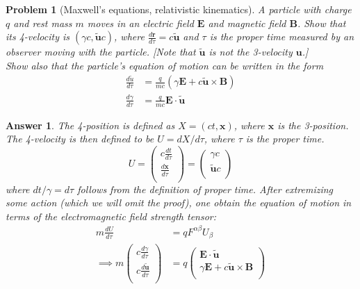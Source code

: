 \documentclass[a4paper]{article}
\newtheorem{ans}{Answer}
\theoremstyle{new}
\newtheorem{qns}{Problem}
\begin{document}
\begin{qns}[Maxwell's equations, relativistic kinematics]
A particle with charge $q$ and rest mass $m$ moves in an electric field $\mathbf{E}$ and magnetic field $\mathbf{B}$. Show that its 4-velocity is $(\gamma c,\mathbf{\tilde{u}}c)$, where $\frac{d\mathbf{r}}{d\tau}=c\tilde{\mathbf{u}}$ and $\tau$ is the proper time measured by an observer moving with the particle. [Note that $\tilde{\mathbf{u}}$ is not the 3-velocity $\mathbf{u}$.]\\[5pt]
Show also that the particle’s equation of motion can be written in the form
\begin{align}
    \frac{d\tilde{u}}{d\tau}&=\frac{q}{mc}(\gamma\mathbf{E}+c\tilde{\mathbf{u}}\times\mathbf{B})\nonumber\\
    \frac{d\gamma}{d\tau}&=\frac{q}{mc}\mathbf{E}\cdot\mathbf{\tilde{u}}\nonumber
\end{align}
\end{qns}
\begin{ans}
The 4-position is defined as $X=(ct,\mathbf{x})$, where $\mathbf{x}$ is the 3-position. The 4-velocity is then defined to be $U=dX/d\tau$, where $\tau$ is the proper time.
$$U=\begin{pmatrix}c\frac{dt}{d\tau}\\\frac{d\mathbf{x}}{d\tau}\\\end{pmatrix}=\begin{pmatrix}\gamma c\\\mathbf{\tilde{u}}c\\\end{pmatrix}$$
where $dt/\gamma=d\tau$ follows from the definition of proper time. After extremizing some action (which we will omit the proof), one obtain the equation of motion in terms of the electromagnetic field strength tensor:
\begin{align}
m\frac{dU}{d\tau}&=qF^{\alpha\beta}U_\beta\nonumber\\
\implies m\begin{pmatrix}c\frac{d\gamma}{d\tau}\\c\frac{d\mathbf{\tilde{u}}}{d\tau}\\\end{pmatrix}&=q\begin{pmatrix}\mathbf{E}\cdot\mathbf{\tilde{u}}\\\gamma\mathbf{E}+c\mathbf{\tilde{u}}\times\mathbf{B}\\\end{pmatrix}\nonumber
\end{align}
\end{ans}
\end{document}
